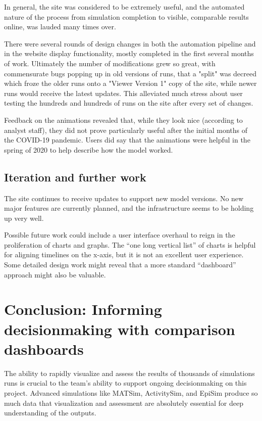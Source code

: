 In general, the site was considered to be extremely useful, and the automated nature of the process from simulation completion to visible, comparable results online, was lauded many times over.

There were several rounds of design changes in both the automation pipeline and in the website display functionality, mostly completed in the first several months of work. Ultimately the number of modifications grew so great, with commensurate bugs popping up in old versions of runs, that a "split" was decreed which froze the older runs onto a "Viewer Version 1" copy of the site, while newer runs would receive the latest updates. This alleviated much stress about user testing the hundreds and hundreds of runs on the site after every set of changes.

Feedback on the animations revealed that, while they look nice (according to analyst staff), they did not prove particularly useful after the initial months of the COVID-19 pandemic. Users did say that the animations were helpful in the spring of 2020 to help describe how the model worked.

\hypertarget{covid-iteration-and-further-work}{%
\subsection{Iteration and further work}\label{covid-iteration-and-further-work}}

The site continues to receive updates to support new model versions. No new major features are currently planned, and the infrastructure seems to be holding up very well.

Possible future work could include a user interface overhaul to reign in the proliferation of charts and graphs. The ``one long vertical list'' of charts is helpful for aligning timelines on the x-axis, but it is not an excellent user experience. Some detailed design work might reveal that a more standard ``dashboard'' approach might also be valuable.

\hypertarget{covid-informing-decisionmaking-with-comparison-dashboards}{%
\section{Conclusion: Informing decisionmaking with comparison dashboards}\label{covid-informing-decisionmaking}}

The ability to rapidly visualize and assess the results of thousands of simulations runs is crucial to the team's ability to support ongoing decisionmaking on this project. Advanced simulations like MATSim, ActivitySim, and EpiSim produce so much data that visualization and assessment are absolutely essential for deep understanding of the outputs.

